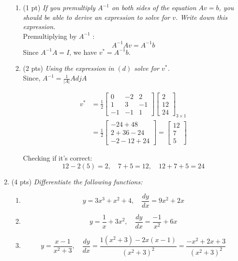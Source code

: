 \documentclass{./../../Latex/tests}
\begin{document}
\begin{enumerate}
\begin{enumerate}
  \item (1 pt) \textit{If you premultiply $A^{-1}$ on both sides of the equation $ Av=b $, you should be able to derive an expression to solve for $v$. Write down this expression. } \\

  Premultiplying by $A^{-1}$ :
$$
A^{-1} A v=A^{-1} b 
$$
Since $A^{-1} A=I$, we have  $v^*=A^{-1} b$. \\


  
  \item (2 pts) \textit{Using the expression in $(d)$ solve for $v^*$. } \\

Since, $A^{-1}=\frac{1}{|A|} A d j A$

$$
\begin{aligned}
v^{*} &=\frac{1}{2}\left[\begin{array}{rrr}
0 & -2 & 2 \\
1 & 3 & -1 \\
-1 & -1 & 1
\end{array}\right]\left[\begin{array}{c}
2 \\
12 \\
24
\end{array}\right]_{3 \times 1} \\
&=\frac{1}{2}\left[\begin{array}{c}
-24+48 \\
2+36-24 \\
-2-12+24
\end{array}\right]=\left[\begin{array}{c}
12 \\
7 \\
5
\end{array}\right]
\end{aligned}
$$

Checking if it's correct:
$$
12-2(5)=2, \quad  7+5=12, \quad 12+7+5=24
$$
\end{enumerate}

\item (4 pts) \textit{Differentiate the following functions:}
\begin{enumerate}
\item $$ y = 3x^3+x^2+4, \quad \frac{d y}{d x}=9 x^{2}+2 x $$
  \item $$ y= \frac{1}{x}+3x^2, \quad \frac{d y}{d x}=\frac{-1}{x^{2}}+6 x$$
  \item $$y=\frac{x-1}{x^2+3}, \quad \frac{d y}{d x}= \frac{1\left(x^{2}+3\right)-2 x(x-1)}{\left(x^{2}+3\right)^{2}} =\frac{-x^{2}+2 x+3}{\left(x^{2}+3\right)^{2}}$$
\end{enumerate}



\end{enumerate}
\end{document}
